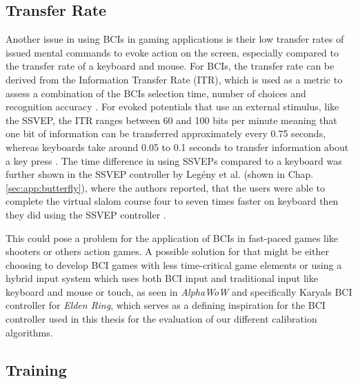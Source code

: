 \subsection{Transfer Rate}


Another issue in using BCIs in gaming applications is their low transfer rates of issued mental commands to evoke action on the screen, especially compared to the transfer rate of a keyboard and mouse. 
For BCIs, the transfer rate can be derived from the Information Transfer Rate (ITR), which is used as a metric to assess a combination of the BCIs selection time, number of choices and recognition accuracy \cite{yadav-2020}. For evoked potentials that use an external stimulus, like the SSVEP, the ITR ranges between 60 and 100 bits per minute \cite{yadav-2020} meaning that one bit of information can be transferred approximately every 0.75 seconds, whereas keyboards take around 0.05 to 0.1 seconds to transfer information about a key press \cite{casiez-2017, wimmer-2019}. The time difference in using SSVEPs compared to a keyboard was further shown in the SSVEP controller by Legény et al. (shown in Chap. \ref{sec:app:butterfly}), where the authors reported, that the users were able to complete the virtual slalom course four to seven times faster on keyboard then they did using the SSVEP controller \cite{legeny-2011}.

This could pose a problem for the application of BCIs in fast-paced games like shooters or others action games. A possible solution for that might be either choosing to develop BCI games with less time-critical game elements or using a hybrid input system which uses both BCI input and traditional input like keyboard and mouse or touch, as seen in \emph{AlphaWoW} and specifically Karyals BCI controller for \emph{Elden Ring}, which serves as a defining inspiration for the BCI controller used in this thesis for the evaluation of our different calibration algorithms.

\subsection{Training}
\label{chall:training}

